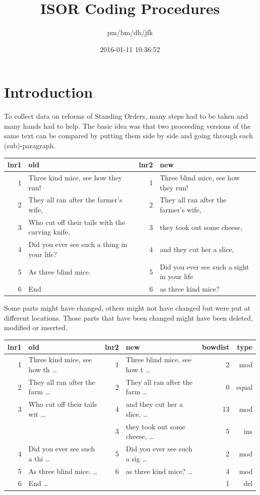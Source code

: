 \documentclass[10pt,]{article}
\title{ISOR Coding Procedures}
\author{pm/bm/dh/jfk}
\date{2016-01-11 10:36:52}
\begin{document}
\maketitle

{
\hypersetup{linkcolor=black}
\setcounter{tocdepth}{2}
\tableofcontents
}
\makeatletter
\newcommand{\justified}{%
  \rightskip\z@skip%
  \leftskip\z@skip} \makeatother

\newpage

\section{Introduction}\label{introduction}

To collect data on reforms of Standing Orders, many steps had to be
taken and many hands had to help. The basic idea was that two proceeding
versions of the same text can be compared by putting them side by side
and going through each (sub)-paragraph.

\begin{longtable}[c]{@{}rlrl@{}}
\toprule
lnr1 & old & lnr2 & new\tabularnewline
\midrule
\endhead
1 & Three kind mice, see how they run! & 1 & Three blind mice, see how
they run!\tabularnewline
2 & They all ran after the farmer's wife, & 2 & They all ran after the
farmer's wife,\tabularnewline
3 & Who cut off their tails with the carving knife, & 3 & they took out
some cheese,\tabularnewline
4 & Did you ever see such a thing in your life? & 4 & and they cut her a
slice,\tabularnewline
5 & As three blind mice. & 5 & Did you ever see such a sight in your
life\tabularnewline
6 & End & 6 & as three kind mice?\tabularnewline
\bottomrule
\end{longtable}

Some parts might have changed, others might not have changed but were
put at different locations. Those parts that have been changed might
have been deleted, modified or inserted.

\begin{longtable}[c]{@{}rlrlrr@{}}
\toprule
lnr1 & old & lnr2 & new & bowdist & type\tabularnewline
\midrule
\endhead
1 & Three kind mice, see how th \ldots{} & 1 & Three blind mice, see how
t \ldots{} & 2 & mod\tabularnewline
2 & They all ran after the farm \ldots{} & 2 & They all ran after the
farm \ldots{} & 0 & equal\tabularnewline
3 & Who cut off their tails wit \ldots{} & 4 & and they cut her a slice,
\ldots{} & 13 & mod\tabularnewline
& & 3 & they took out some cheese, \ldots{} & 5 & ins\tabularnewline
4 & Did you ever see such a thi \ldots{} & 5 & Did you ever see such a
sig \ldots{} & 2 & mod\tabularnewline
5 & As three blind mice. \ldots{} & 6 & as three kind mice? \ldots{} & 4
& mod\tabularnewline
6 & End \ldots{} & & & 1 & del\tabularnewline
\bottomrule
\end{longtable}
\end{document}
